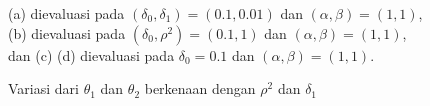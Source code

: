 \documentclass[
 manuscript=article,  %
  layout=publish, 
  year=2024, 
  month= Februari, %
  volume=8,
  number=1 
]{JIKO}
\begin{document}
\begin{figure}[ht!]
	\centering
	
	
	\medskip
	
	\begin{minipage}{0.9\textwidth}
		\small
		(a) dievaluasi pada $(\delta_0, \delta_1)=(0.1,0.01)$ dan $(\alpha,\beta)=(1,1)$, \\
		(b) dievaluasi pada $(\delta_0,\rho^2)=(0.1,1)$ dan $(\alpha,\beta)=(1,1)$, \\
		dan (c) (d) dievaluasi pada $\delta_0=0.1$ dan $(\alpha,\beta)=(1,1)$.
	\end{minipage}
	\medskip
	
	\caption{Variasi dari $\theta_1$ dan $\theta_2$ berkenaan dengan $\rho^2$ dan $\delta_1$} \label{subfigure}
\end{figure}
\end{document}
